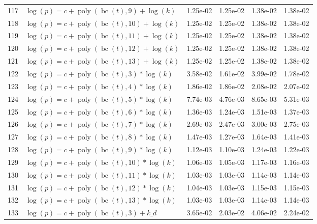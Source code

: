 \documentclass[12pt,a4paper]{article}
\DeclareMathOperator{\bc}{bc}
\DeclareMathOperator{\poly}{poly}
\begin{document}
\begin{longtable}[t]{ll>{\raggedleft\arraybackslash}p{2cm}>{\raggedleft\arraybackslash}p{2cm}>{\raggedleft\arraybackslash}p{2cm}>{\raggedleft\arraybackslash}p{2cm}}
\rowcolor{gray!6}  117 & $\log(p) = c + \poly\left( \bc(t), 9 \right) + \log(k)$ & 1.25e-02 & 1.25e-02 & 1.38e-02 & 1.38e-02\\
118 & $\log(p) = c + \poly\left( \bc(t), 10 \right) + \log(k)$ & 1.25e-02 & 1.25e-02 & 1.38e-02 & 1.38e-02\\
\rowcolor{gray!6}  119 & $\log(p) = c + \poly\left( \bc(t), 11 \right) + \log(k)$ & 1.25e-02 & 1.25e-02 & 1.38e-02 & 1.38e-02\\
120 & $\log(p) = c + \poly\left( \bc(t), 12 \right) + \log(k)$ & 1.25e-02 & 1.25e-02 & 1.38e-02 & 1.38e-02\\
\rowcolor{gray!6}  121 & $\log(p) = c + \poly\left( \bc(t), 13 \right) + \log(k)$ & 1.25e-02 & 1.25e-02 & 1.38e-02 & 1.38e-02\\
122 & $\log(p) = c + \poly\left( \bc(t), 3 \right) * \log(k)$ & 3.58e-02 & 1.61e-02 & 3.99e-02 & 1.78e-02\\
\rowcolor{gray!6}  123 & $\log(p) = c + \poly\left( \bc(t), 4 \right) * \log(k)$ & 1.86e-02 & 1.86e-02 & 2.08e-02 & 2.07e-02\\
124 & $\log(p) = c + \poly\left( \bc(t), 5 \right) * \log(k)$ & 7.74e-03 & 4.76e-03 & 8.65e-03 & 5.31e-03\\
\rowcolor{gray!6}  125 & $\log(p) = c + \poly\left( \bc(t), 6 \right) * \log(k)$ & 1.36e-03 & 1.24e-03 & 1.51e-03 & 1.37e-03\\
126 & $\log(p) = c + \poly\left( \bc(t), 7 \right) * \log(k)$ & 2.69e-03 & 2.47e-03 & 3.00e-03 & 2.75e-03\\
\rowcolor{gray!6}  127 & $\log(p) = c + \poly\left( \bc(t), 8 \right) * \log(k)$ & 1.47e-03 & 1.27e-03 & 1.64e-03 & 1.41e-03\\
128 & $\log(p) = c + \poly\left( \bc(t), 9 \right) * \log(k)$ & 1.12e-03 & 1.10e-03 & 1.24e-03 & 1.22e-03\\
\rowcolor{gray!6}  129 & $\log(p) = c + \poly\left( \bc(t), 10 \right) * \log(k)$ & 1.06e-03 & 1.05e-03 & 1.17e-03 & 1.16e-03\\
130 & $\log(p) = c + \poly\left( \bc(t), 11 \right) * \log(k)$ & 1.03e-03 & 1.03e-03 & 1.14e-03 & 1.14e-03\\
\rowcolor{gray!6}  131 & $\log(p) = c + \poly\left( \bc(t), 12 \right) * \log(k)$ & 1.04e-03 & 1.03e-03 & 1.15e-03 & 1.15e-03\\
132 & $\log(p) = c + \poly\left( \bc(t), 13 \right) * \log(k)$ & 1.03e-03 & 1.03e-03 & 1.14e-03 & 1.14e-03\\
\rowcolor{gray!6}  133 & $\log(p) = c + \poly\left( \bc(t), 3 \right) + k\_d$ & 3.65e-02 & 2.03e-02 & 4.06e-02 & 2.24e-02\\

\end{longtable}
\end{document}
